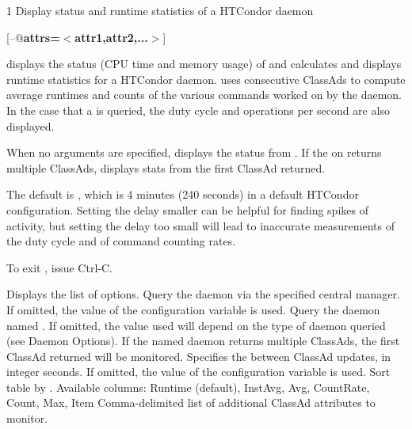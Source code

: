 \begin{ManPage}{\label{man-condor-top}}{1}
{Display status and runtime statistics of a HTCondor daemon}


\Synopsis {}

[\verb@--@\textbf{attrs=$<$attr1,attr2,...$>$}]

\Description
{} displays the status (CPU time and memory usage) of
and calculates and displays runtime statistics for
a HTCondor daemon.
 uses consecutive ClassAds
to compute average runtimes and counts
of the various commands
worked on by the daemon.
In the case that a  is queried,
the duty cycle and operations per second are also displayed.

When no arguments are specified,
 displays the  status from .
If the  on  returns multiple ClassAds,
 displays stats from the first ClassAd returned.

The default  is ,
which is 4 minutes (240 seconds)
in a default HTCondor configuration.
Setting the delay smaller 
can be helpful 
for finding spikes of activity,
but setting the delay too small
will lead to inaccurate measurements
of the  duty cycle
and of command counting rates.

To exit ,
issue Ctrl-C.

\begin{Options}

            {Displays the list of options.}
            {Query the daemon via the specified central manager. If
              omitted, the value of the configuration variable
               is used.}
            {Query the daemon named . If omitted, the value
              used will depend on the type of daemon queried (see
              Daemon Options). If the named daemon returns multiple
              ClassAds, the first ClassAd returned will be
              monitored.}
            {Specifies the  between ClassAd updates, in
              integer seconds. If omitted, the value of the
              configuration variable  is
              used.}
            {Sort table by . Available columns: Runtime
              (default), InstAvg, Avg, CountRate, Count, Max, Item}
            {Comma-delimited list of additional ClassAd attributes
              to monitor.}


\end{Options}
\end{ManPage}
